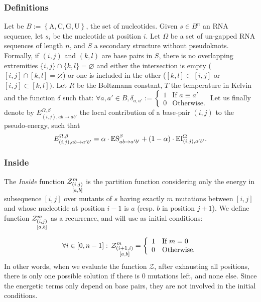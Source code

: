 \subsubsection{Definitions}
Let be $B:=\left\{\text{A},\text{C},\text{G},\text{U}\right\}$, the set of nucleotides.
Given $s\in B^n$ an RNA sequence, let $s_i$ be the nucleotide at position $i$. Let $\Omega$ be a set of un-gapped RNA sequences of
length $n$, and $S$ a secondary structure without pseudoknots. 
Formally, if $(i,j)$ and $(k,l)$ are base pairs in $S$, there is no overlapping extremities
 $\{i,j\}\cap \{k,l\}=\varnothing$ and either the intersection is empty 
 ($[i,j]\cap[k,l]=\varnothing$) or one is included in the other ($[k,l]\subset[i,j]$ or 
 $[i,j]\subset[k,l])$. Let $R$ be the Boltzmann constant, $T$ the temperature in Kelvin and
  the function $\delta$ such that: 
 $\forall a,a' \in B, \delta_{a,a'}:=\left\{\begin{array}{ll}
															1 & \text{If } a\equiv a'\\
															0 & \text{Otherwise.}
														\end{array}\right.$
 Let us finally denote by $E_{(i,j),ab \to ab'}^{\Omega,\beta}$ the local contribution of a base-pair $(i,j)$ to the pseudo-energy, such that
\begin{equation}
  E_{(i,j),ab \to a'b'}^{\Omega,\beta}  = \alpha \cdot\text{ES}^\beta_{a b \to a' b'}+(1-\alpha)\cdot\text{EI}^{\Omega}_{(i,j),a'b'}.
\end{equation}


\subsubsection{Inside}
The \emph{Inside} function $\Z{i,j}{m}{a,b}$ is the partition function considering only the 
energy in subsequence $[i,j]$ over mutants of $s$ having exactly $m$ mutations between $[i,j]$ and whose nucleotide at position $i-1$ is $a$ (resp. $b$ in position $j+1$).
We define function $\Z{i,j}{m}{a,b}$ as a recurrence, and will use as initial conditions:

\begin{equation}
	\forall i \in [0,n-1]:\, \Z{i+1,i}{m}{a,b}=\left\{
	\begin{array}{ll}
		1 &\text{If } m = 0\\
		0 &\text{Otherwise.}
	\end{array}\right.
\label{eq:Z_in}
\end{equation}
In other words, when we evaluate the function $\mathcal Z$, after exhausting all positions, there 
is only one possible solution if there is $0$ mutations left, and none else. Since the 
energetic terms only depend on base pairs, they are not involved in the initial conditions. 

